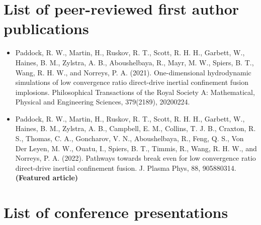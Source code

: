 \section{List of peer-reviewed first author publications}

\begin{itemize}
	\item Paddock, R. W., Martin, H., Ruskov, R. T., Scott, R. H. H., Garbett, W., Haines, B. M., Zylstra, A. B., Aboushelbaya, R., Mayr, M. W., Spiers, B. T., Wang, R. H. W., and Norreys, P. A. (2021). One-dimensional hydrodynamic simulations of low convergence ratio direct-drive inertial confinement fusion implosions. Philosophical Transactions of the Royal Society A: Mathematical, Physical and Engineering Sciences, 379(2189), 20200224.
	\item Paddock, R. W., Martin, H., Ruskov, R. T., Scott, R. H. H., Garbett, W., Haines, B. M., Zylstra, A. B., Campbell, E. M., Collins, T. J. B., Craxton, R. S., Thomas, C. A., Goncharov, V. N., Aboushelbaya, R., Feng, Q. S., Von Der Leyen, M. W., Ouatu, I., Spiers, B. T., Timmis, R., Wang, R. H. W., and Norreys, P. A. (2022). Pathways towards break even for low convergence ratio direct-drive inertial confinement fusion. J. Plasma Phys, 88, 905880314. \textbf{(Featured article)}
\end{itemize}

\section{List of conference presentations}

